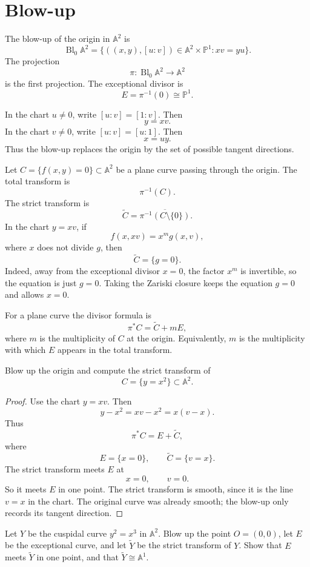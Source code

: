 \section{Blow-up}
\label{section-blow-up}

\noindent
The blow-up of the origin in $\mathbb{A}^2$ is
$$
\operatorname{Bl}_0\mathbb{A}^2
=
\{((x,y),[u:v])\in \mathbb{A}^2\times
\mathbb{P}^1:xv=yu\}.
$$
The projection
$$
\pi:\operatorname{Bl}_0\mathbb{A}^2\to
\mathbb{A}^2
$$
is the first projection. The exceptional divisor is
$$
E=\pi^{-1}(0)\cong \mathbb{P}^1.
$$

\medskip\noindent
In the chart $u\neq 0$, write $[u:v]=[1:v]$.
Then
$$
y=xv.
$$
In the chart $v\neq 0$, write $[u:v]=[u:1]$.
Then
$$
x=uy.
$$
Thus the blow-up replaces the origin by the set of
possible tangent directions.

\medskip\noindent
Let $C=\{f(x,y)=0\}\subset \mathbb{A}^2$ be a
plane curve passing through the origin. The total
transform is
$$
\pi^{-1}(C).
$$
The strict transform is
$$
\widetilde C=
\overline{\pi^{-1}(C\setminus\{0\})}.
$$
In the chart $y=xv$, if
$$
f(x,xv)=x^m g(x,v),
$$
where $x$ does not divide $g$, then
$$
\widetilde C=\{g=0\}.
$$
Indeed, away from the exceptional divisor $x=0$, the
factor $x^m$ is invertible, so the equation is just
$g=0$. Taking the Zariski closure keeps the equation
$g=0$ and allows $x=0$.

\medskip\noindent
For a plane curve the divisor formula is
$$
\pi^*C=\widetilde C+mE,
$$
where $m$ is the multiplicity of $C$ at the origin.
Equivalently, $m$ is the multiplicity with which
$E$ appears in the total transform.

\begin{exercise}
\label{exercise-blow-up-parabola}
Blow up the origin and compute the strict transform
of
$$
C=\{y=x^2\}\subset \mathbb{A}^2.
$$
\end{exercise}

\begin{proof}
Use the chart $y=xv$. Then
$$
y-x^2=xv-x^2=x(v-x).
$$
Thus
$$
\pi^*C=E+\widetilde C,
$$
where
$$
E=\{x=0\},
\qquad
\widetilde C=\{v=x\}.
$$
The strict transform meets $E$ at
$$
x=0,
\qquad
v=0.
$$
So it meets $E$ in one point. The strict transform is
smooth, since it is the line $v=x$ in the chart.
The original curve was already smooth; the blow-up
only records its tangent direction.
\end{proof}

\begin{exercise}
\label{exercise-cuspidal-curve-blow-up}
Let $Y$ be the cuspidal curve $y^2=x^3$ in
$\mathbb{A}^2$.
Blow up the point $O=(0,0)$, let $E$ be the
exceptional curve,
and let $\widetilde Y$ be the strict transform
of $Y$.
Show that $E$ meets $\widetilde Y$ in one point,
and that $\widetilde Y\cong \mathbb{A}^1$.
\end{exercise}

